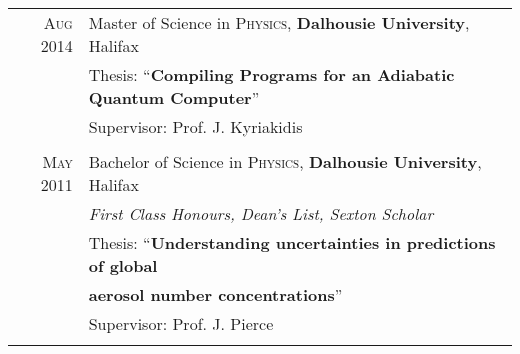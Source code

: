 \documentclass[a4paper,11pt]{article} %
\begin{document}
\begin{tabular}{rl}	

\textsc{Aug} 2014 & Master of Science in \textsc{Physics}, \textbf{Dalhousie University}, Halifax \\
& Thesis: ``\textbf{Compiling Programs for an Adiabatic Quantum Computer}'' \\
& \small Supervisor: Prof. J. Kyriakidis \\
& \\

\textsc{May} 2011 & Bachelor of Science in \textsc{Physics}, \textbf{Dalhousie University}, Halifax \\
& \emph{First Class Honours, Dean's List, Sexton Scholar}  \\
& Thesis: ``\textbf{Understanding uncertainties in predictions of global} \\
& \textbf{aerosol number concentrations}''\\
& \small Supervisor: Prof. J. Pierce \\
& \\







\end{tabular}
\end{document}
